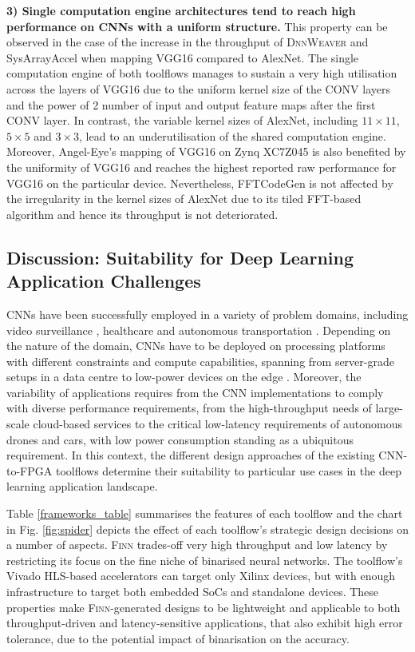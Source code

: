 \documentclass[format=acmsmall, review=false, screen=true]{acmart}
\begin{document}
\textbf{3) Single computation engine architectures tend to reach high performance on CNNs with a uniform structure.} This property can be observed in the case of the increase in the throughput of \textsc{DnnWeaver} and SysArrayAccel when mapping VGG16 compared to AlexNet. The single computation engine of both toolflows manages to sustain a very high utilisation across the layers of VGG16 due to the uniform kernel size of the CONV layers and the power of 2 number of input and output feature maps after the first CONV layer. In contrast, the variable kernel sizes of AlexNet, including $11 \times 11$, $5 \times 5$ and $3 \times 3$, lead to an underutilisation of the shared computation engine. Moreover, Angel-Eye's mapping of VGG16 on Zynq XC7Z045 is also benefited by the uniformity of VGG16 and reaches the highest reported raw performance for VGG16 on the particular device. {\color{black}Nevertheless, FFTCodeGen is not affected by the irregularity in the kernel sizes of AlexNet due to its tiled FFT-based algorithm and hence its throughput is not deteriorated.}




\subsection{Discussion: Suitability for Deep Learning Application Challenges}{\color{black}CNNs have been successfully employed in a variety of problem domains, including video surveillance \cite{Shao2017crowd_understanding}, healthcare \cite{Esteva2017} and autonomous transportation \cite{Chen2015deepdrive}. Depending on the nature of the domain, CNNs have to be deployed on processing platforms with different constraints and compute capabilities, spanning from server-grade setups in a data centre \cite{Caulfield2016} to low-power devices on the edge \cite{Smolyanskiy_2017}. Moreover, the variability of applications requires from the CNN implementations to comply with diverse performance requirements, from the high-throughput needs of large-scale cloud-based services to the critical low-latency requirements of autonomous drones and cars, with low power consumption standing as a ubiquitous requirement. In this context, the different design approaches of the existing CNN-to-FPGA toolflows determine their suitability to particular use cases in the deep learning application landscape.}

Table \ref{frameworks_table} summarises the features of each toolflow and the chart in Fig. \ref{fig:spider} depicts the effect of each toolflow's strategic design decisions on a number of aspects. \textsc{Finn} trades-off very high throughput and low latency by restricting its focus on the fine niche of binarised neural networks. The toolflow's Vivado HLS-based accelerators can target only Xilinx devices, but with enough infrastructure to target both embedded SoCs and standalone devices. {\color{black}These properties make \textsc{Finn}-generated designs to be lightweight and applicable to both throughput-driven and latency-sensitive applications, that also exhibit high error tolerance, due to the potential impact of binarisation on the accuracy.}
\end{document}
